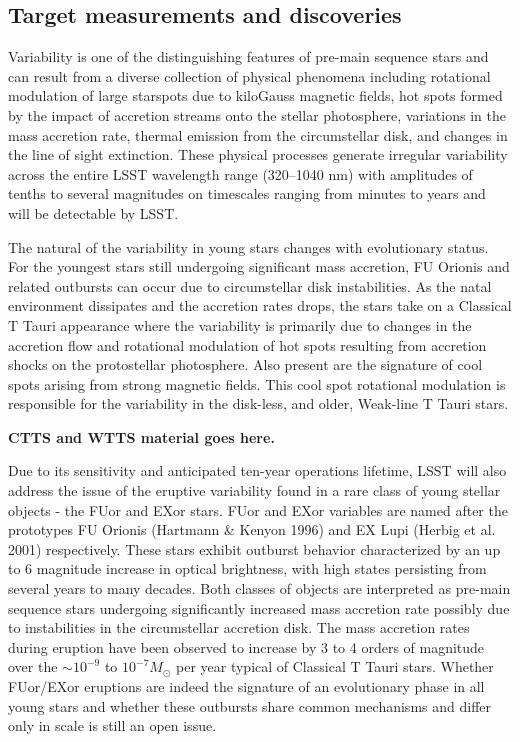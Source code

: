 
\subsection{Target measurements and discoveries}
\label{sec:\secname:targets}

Variability is one of the distinguishing features of pre-main sequence stars and can result from a
diverse collection of physical phenomena including rotational modulation of large starspots due to
kiloGauss magnetic fields, hot spots formed by the impact of accretion streams onto the stellar
photosphere, variations in the mass accretion rate, thermal emission from the circumstellar disk,
and changes in the line of sight extinction. These physical processes generate irregular variability
across the entire LSST wavelength range (320–1040 nm) with amplitudes of tenths to several
magnitudes on timescales ranging from minutes to years and will be detectable by LSST.

The natural of the variability in young stars changes with evolutionary status. For the youngest
stars still undergoing significant mass accretion, FU Orionis and related outbursts can occur 
due to circumstellar disk instabilities. As the natal environment dissipates and the accretion
rates drops, the stars take on a Classical T Tauri appearance where the variability is 
primarily due to changes in the accretion flow and rotational modulation of hot spots resulting
from accretion shocks on the protostellar photosphere. Also present are the signature of
cool spots arising from strong magnetic fields. This cool spot rotational modulation is 
responsible for the variability in the disk-less, and older, Weak-line T Tauri stars.

{\bf CTTS and WTTS material goes here.}

Due to its sensitivity and anticipated ten-year operations lifetime, LSST will also address the issue
of the eruptive variability found in a rare class of young stellar objects - the FUor and EXor stars.
FUor and EXor variables are named after the prototypes FU Orionis (Hartmann \& Kenyon 1996)
and EX Lupi (Herbig et al. 2001) respectively. These stars exhibit outburst behavior characterized
by an up to 6 magnitude increase in optical brightness, with high states persisting from several years
to many decades. Both classes of objects are interpreted as pre-main sequence stars undergoing
significantly increased mass accretion rate possibly due to instabilities in the circumstellar accretion
disk. The mass accretion rates during eruption have been observed to increase by 3 to 4 orders
of magnitude over the $\sim 10^{-9}$
to $10^{-7} M_{\odot}$ per year typical of Classical T Tauri stars. Whether
FUor/EXor eruptions are indeed the signature of an evolutionary phase in all young stars and
whether these outbursts share common mechanisms and differ only in scale is still an open issue.

